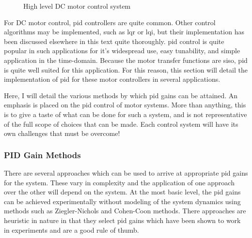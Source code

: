\begin{figure}

    \caption{High level DC motor control system}
    \label{fig:dc motor controller}
\end{figure}

For DC motor control, \gls{pid} controllers are quite common. Other control algorithms may be implemented, such as \gls{lqr} or \gls{lqi}, but their implementation has been discussed elsewhere in this text quite thoroughly. \Gls{pid} control is quite popular in such applications for it's widespread use, easy tunability, and simple application in the time-domain.  Because the motor transfer functions are \gls{siso}, \gls{pid} is quite well suited for this application. For this reason, this section will detail the implementation of \gls{pid} for these motor controllers in several applications.

Here, I will detail the various methods by which \gls{pid} gains can be attained. An emphasis is placed on the \gls{pid} control of motor systems. More than anything, this is to give a taste of what can be done for such a system, and is not representative of the full scope of choices that can be made. Each control system will have its own challenges that must be overcome! 

\subsubsection{PID Gain Methods}
There are several approaches which can be used to arrive at appropriate \gls{pid} gains for the system. These vary in complexity and the application of one approach over the other will depend on the system. At the most basic level, the \gls{pid} gains can be achieved experimentally without modeling of the system dynamics using methods such as Ziegler-Nichols and Cohen-Coon methods. There approaches are heuristic in nature in that they select \gls{pid} gains which have been shown to work in experiments and are a good rule of thumb.


